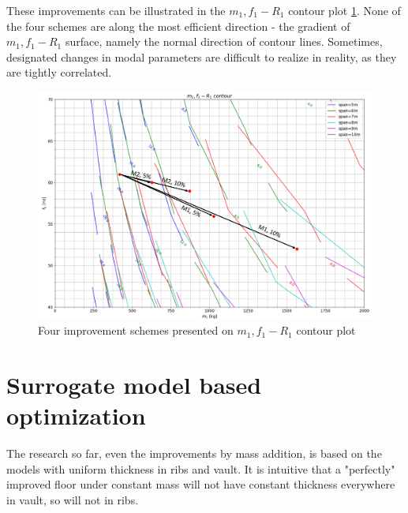 These improvements can be illustrated in the $m_1,f_1-R_1$ contour plot \ref{fig:m1_f1_improve}. None of the four schemes are along the most efficient direction - the gradient of $m_1,f_1-R_1$ surface, namely the normal direction of contour lines. Sometimes, designated changes in modal parameters are difficult to realize in reality, as they are tightly correlated.

\begin{figure}[H]
\centering
\includegraphics[width=.95\textwidth]{images/m1_f1_improve}
\caption{Four improvement schemes presented on $m_1,f_1-R_1$ contour plot}
\label{fig:m1_f1_improve}
\end{figure}

\section{Surrogate model based optimization}
The research so far, even the improvements by mass addition, is based on the models with uniform thickness in ribs and vault. It is intuitive that a "perfectly" improved floor under constant mass will not have constant thickness everywhere in vault, so will not in ribs. 

